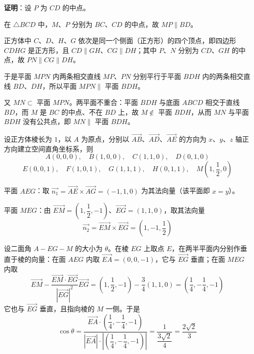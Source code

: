 \begin{answer}

\textbf{证明}：设 \(P\) 为 \(CD\) 的中点。

在 \(\triangle BCD\) 中，\(M\)、\(P\) 分别为 \(BC\)、\(CD\) 的中点，故 \(MP\parallel BD\)。

正方体中 \(C\)、\(D\)、\(H\)、\(G\) 依次是同一个侧面（正方形）的四个顶点，即四边形 \(CDHG\) 是正方形，且 \(CD\parallel GH\)、\(CG\parallel DH\)；其中 \(P\)、\(N\) 分别为 \(CD\)、\(GH\) 的中点，故 \(PN\parallel CG\parallel DH\)。

于是平面 \(MPN\) 内两条相交直线 \(MP\)、\(PN\) 分别平行于平面 \(BDH\) 内的两条相交直线 \(BD\)、\(DH\)，所以平面 \(MPN\parallel\) 平面 \(BDH\)。

又 \(MN\subset\) 平面 \(MPN\)。两平面不重合：平面 \(BDH\) 与底面 \(ABCD\) 相交于直线 \(BD\)，而 \(M\) 是 \(BC\) 的中点、不在 \(BD\) 上，故 \(M\notin\) 平面 \(BDH\)，从而 \(MN\) 与平面 \(BDH\) 没有公共点，即 \(MN\parallel\) 平面 \(BDH\)。


设正方体棱长为 \(1\)，以 \(A\) 为原点，分别以 \(\overrightarrow{AB}\)、\(\overrightarrow{AD}\)、\(\overrightarrow{AE}\) 的方向为 \(x\)、\(y\)、\(z\) 轴正方向建立空间直角坐标系，则
\nopagebreak[4]
\[A(0,0,0),\quad B(1,0,0),\quad C(1,1,0),\quad D(0,1,0)\]
\nopagebreak[4]
\[E(0,0,1),\quad F(1,0,1),\quad G(1,1,1),\quad H(0,1,1),\quad M\left(1,\dfrac12,0\right)\]

平面 \(AEG\)：取 \(\overrightarrow{n_1}=\overrightarrow{AE}\times\overrightarrow{AG}=(-1,1,0)\) 为其法向量（该平面即 \(x=y\)）。

平面 \(MEG\)：由 \(\overrightarrow{EM}=\left(1,\dfrac12,-1\right)\)、\(\overrightarrow{EG}=(1,1,0)\)，取其法向量
\nopagebreak[4]
\[\overrightarrow{n_2}=\overrightarrow{EM}\times\overrightarrow{EG}=\left(1,-1,\dfrac12\right)\]

设二面角 \(A-EG-M\) 的大小为 \(\theta\)。在棱 \(EG\) 上取点 \(E\)，在两半平面内分别作垂直于棱的向量：在面 \(AEG\) 内取 \(\overrightarrow{EA}=(0,0,-1)\)，它与 \(\overrightarrow{EG}\) 垂直；在面 \(MEG\) 内取
\nopagebreak[4]
\[\overrightarrow{EM}-\dfrac{\overrightarrow{EM}\cdot\overrightarrow{EG}}{\left|\overrightarrow{EG}\right|^2}\overrightarrow{EG}=\left(1,\dfrac12,-1\right)-\dfrac34(1,1,0)=\left(\dfrac14,-\dfrac14,-1\right)\]
它也与 \(\overrightarrow{EG}\) 垂直，且指向棱的 \(M\) 一侧。于是
\nopagebreak[4]
\[\cos\theta=\dfrac{\overrightarrow{EA}\cdot\left(\dfrac14,-\dfrac14,-1\right)}{\left|\overrightarrow{EA}\right|\cdot\left|\left(\dfrac14,-\dfrac14,-1\right)\right|}=\dfrac{1}{\dfrac{3\sqrt2}{4}}=\dfrac{2\sqrt2}{3}\]


\end{answer}

